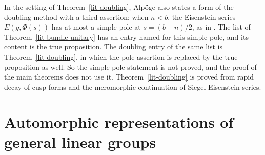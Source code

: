 \begin{remark}\label{lit-vacuous-slot}
In the setting of Theorem~\ref{lit-doubling}, Alpöge also states a form of
the doubling method with a third assertion: when $n<b$, the Eisenstein series
$E(g,\Phi(s))$ has at most a simple pole at $s=(b-n)/2$, as in \cite{Tan99}.
The list of Theorem~\ref{lit-bundle-unitary} has an entry named for this
simple pole, and its content is the true proposition. The doubling entry of
the same list is Theorem~\ref{lit-doubling}, in which the pole assertion is
replaced by the true proposition as well. So the simple-pole statement is not
proved, and the proof of the main theorems does not use it. Theorem~\ref{lit-doubling} is proved from rapid decay of
cusp forms and the meromorphic continuation of Siegel Eisenstein series.
\end{remark}

\section{Automorphic representations of general linear groups}\label{section-lit-gln}


